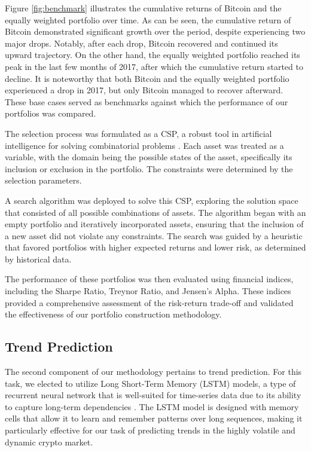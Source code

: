\documentclass[journal]{IEEEtran}
\begin{document}
Figure \ref{fig:benchmark} illustrates the cumulative returns of Bitcoin and the equally weighted portfolio over time. As can be seen, the cumulative return of Bitcoin demonstrated significant growth over the period, despite experiencing two major drops. Notably, after each drop, Bitcoin recovered and continued its upward trajectory. On the other hand, the equally weighted portfolio reached its peak in the last few months of 2017, after which the cumulative return started to decline. It is noteworthy that both Bitcoin and the equally weighted portfolio experienced a drop in 2017, but only Bitcoin managed to recover afterward. These base cases served as benchmarks against which the performance of our portfolios was compared.

The selection process was formulated as a CSP, a robust tool in artificial intelligence for solving combinatorial problems \cite{chen2023deep}. Each asset was treated as a variable, with the domain being the possible states of the asset, specifically its inclusion or exclusion in the portfolio. The constraints were determined by the selection parameters.

A search algorithm was deployed to solve this CSP, exploring the solution space that consisted of all possible combinations of assets. The algorithm began with an empty portfolio and iteratively incorporated assets, ensuring that the inclusion of a new asset did not violate any constraints. The search was guided by a heuristic that favored portfolios with higher expected returns and lower risk, as determined by historical data.

The performance of these portfolios was then evaluated using financial indices, including the Sharpe Ratio, Treynor Ratio, and Jensen’s Alpha. These indices provided a comprehensive assessment of the risk-return trade-off and validated the effectiveness of our portfolio construction methodology.

\subsection{Trend Prediction}
The second component of our methodology pertains to trend prediction. For this task, we elected to utilize Long Short-Term Memory (LSTM) models, a type of recurrent neural network that is well-suited for time-series data due to its ability to capture long-term dependencies \cite{10007138}. The LSTM model is designed with memory cells that allow it to learn and remember patterns over long sequences, making it particularly effective for our task of predicting trends in the highly volatile and dynamic crypto market.
\end{document}
